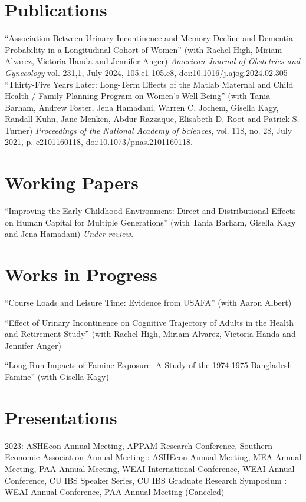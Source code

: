 \documentclass[letterpaper]{article}
\begin{document}
\section*{Publications}
``Association Between Urinary Incontinence and Memory Decline and Dementia Probability in a Longitudinal Cohort of Women'' (with Rachel High, Miriam Alvarez, Victoria Handa and Jennifer Anger) \textit{American Journal of Obstetrics and Gynecology} vol. 231,1, July 2024, 105.e1-105.e8, doi:10.1016/j.ajog.2024.02.305
\\[.5em]
``Thirty-Five Years Later: Long-Term Effects of the Matlab Maternal and Child Health / Family Planning Program on Women's Well-Being'' (with Tania Barham, Andrew Foster, Jena Hamadani, Warren C. Jochem, Gisella Kagy, Randall Kuhn, Jane Menken, Abdur Razzaque, Elisabeth D. Root and Patrick S. Turner) \textit{Proceedings of the National Academy of Sciences}, vol. 118, no. 28, July 2021, p. e2101160118, doi:10.1073/pnas.2101160118.


\section*{Working Papers}
``Improving the Early Childhood Environment: Direct and Distributional Effects on Human Capital for Multiple Generations'' (with Tania Barham, Gisella Kagy and Jena Hamadani) \textit{Under review.}

\section*{Works in Progress}
``Course Loads and Leisure Time: Evidence from USAFA'' (with Aaron Albert)\vspace*{1em}

``Effect of Urinary Incontinence on Cognitive Trajectory of Adults in the Health and Retirement Study'' (with Rachel High, Miriam Alvarez, Victoria Handa and Jennifer Anger)\vspace*{1em}

``Long Run Impacts of Famine Exposure: A Study of the 1974-1975 Bangladesh Famine'' (with Gisella Kagy)

\section*{Presentations}
2023: ASHEcon Annual Meeting, APPAM Research Conference, Southern Economic Association Annual Meeting
\newline{}: ASHEcon Annual Meeting, MEA Annual Meeting, PAA Annual Meeting, WEAI International Conference, WEAI Annual Conference, CU IBS Speaker Series, CU IBS Graduate Research Symposium
\newline{}: WEAI Annual Conference, PAA Annual Meeting (Canceled)
\end{document}
